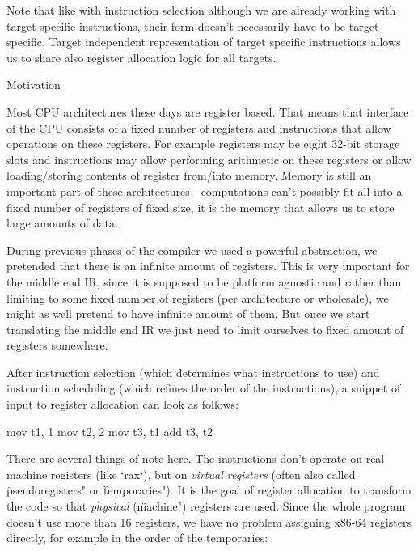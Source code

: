 Note that like with instruction selection although we are already working with
target specific instructions, their form doesn't necessarily have to be target
specific. Target independent representation of target specific instructions
allows us to share also register allocation logic for all targets.

\secc Motivation

Most CPU architectures these days are register based. That means that interface
of the CPU consists of a fixed number of registers and instructions that allow
operations on these registers. For example registers may be eight 32-bit storage slots
and instructions may allow performing arithmetic on these registers or allow
loading/storing contents of register from/into memory. Memory is still an
important part of these architectures---computations can't possibly fit all into
a fixed number of registers of fixed size, it is the memory that allows us to
store large amounts of data.

During previous phases of the compiler we used a powerful abstraction, we
pretended that there is an infinite amount of registers. This is very important
for the middle end IR, since it is supposed to be platform agnostic and rather
than limiting to some fixed number of registers (per architecture or wholesale),
we might as well pretend to have infinite amount of them. But once we start
translating the middle end IR we just need to limit ourselves to fixed amount of
registers somewhere.

After instruction selection (which determines what instructions to use) and
instruction scheduling (which refines the order of the instructions), a snippet
of input to register allocation can look as follows:

\begtt
mov t1, 1
mov t2, 2
mov t3, t1
add t3, t2
\endtt

%
%


There are several things of note here. The instructions don't operate on real
machine registers (like `rax`), but on {\em virtual registers} (often also called
\"pseudoregisters" or \"temporaries"). It is the goal of register allocation to
transform the code so that {\em physical} (\"machine") registers are used.
Since the whole program doesn't use more than 16 registers, we have no problem
assigning x86-64 registers directly, for example in the order of the
temporaries:


